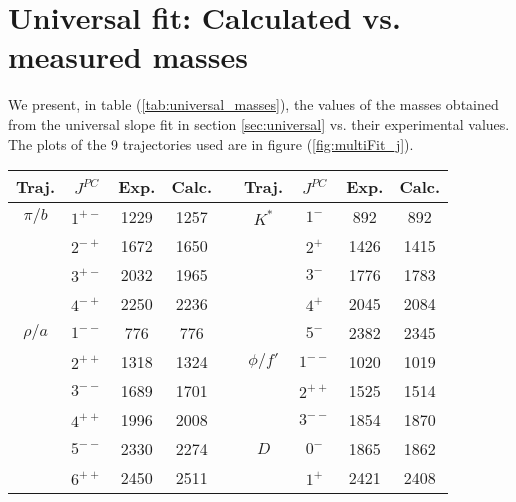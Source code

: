 \documentclass[11pt,a4]{article}
\begin{document}
\clearpage				
\section{Universal fit: Calculated vs. measured masses} \label{app:universal}
We present, in table (\ref{tab:universal_masses}), the values of the masses obtained from the universal slope fit in section \ref{sec:universal} vs. their experimental values. The plots of the 9 trajectories used are in figure (\ref{fig:multiFit_j}).

\begin{table}[tpb] \centering
	\begin{tabular}{|c|c|c|c|c|c|c|c|c|} \hline

		Traj. & \(J^{PC}\) & Exp. & Calc. & \qquad & Traj. & \(J^{PC}\) & Exp. & Calc. \\ \hline\hline
		
		\(\pi/b\) & \(1^{+-}\) & 1229 & 1257 & 			     &	\(K^*\) & \(1^-\)    & 892  & 892  \\

		          & \(2^{-+}\) & 1672 & 1650 &				            &	& \(2^+\)    & 1426 & 1415 \\

		          & \(3^{+-}\) & 2032 & 1965 &				            &	& \(3^-\)    & 1776 & 1783 \\

							& \(4^{-+}\) & 2250 & 2236 &				            &	& \(4^+\)    & 2045 & 2084 \\ \cline{1-4}

		\(\rho/a\)& \(1^{--}\) & 776  & 776  &				            &	& \(5^-\)    & 2382 & 2345 \\ \cline{6-9}

							& \(2^{++}\) & 1318 & 1324 &			   &\(\phi/f'\) & \(1^{--}\) & 1020 & 1019 \\

							& \(3^{--}\) & 1689 & 1701 &				            &	& \(2^{++}\) & 1525 & 1514 \\

							& \(4^{++}\) & 1996 & 2008 &				            &	& \(3^{--}\) & 1854 & 1870 \\ \cline{6-9}

							& \(5^{--}\) & 2330 & 2274 &				    &	\(D\)   & \(0^-\)    & 1865 & 1862 \\

							& \(6^{++}\) & 2450 & 2511 &				            &	& \(1^+\)    & 2421 & 2408 \\ \cline{1-4}


\end{tabular}
\end{table}
\end{document}
